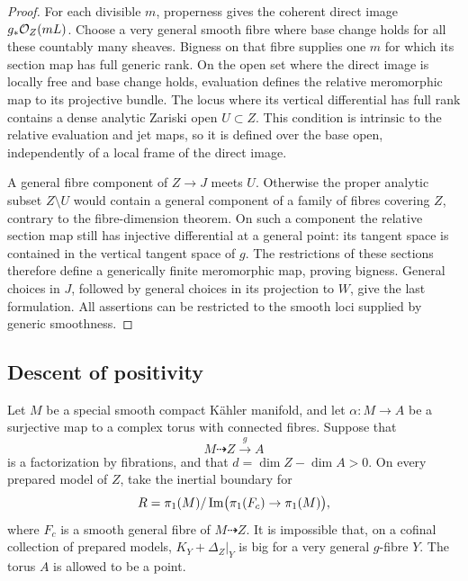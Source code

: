 \begin{proof}
For each divisible \(m\), properness gives the coherent direct image
\(g_*\mathcal O_Z(mL)\). Choose a very general smooth fibre where base
change holds for all these countably many sheaves. Bigness on that
fibre supplies one \(m\) for which its section map has full generic
rank. On the open set where the direct image is locally free and
base change holds, evaluation defines the relative meromorphic map
to its projective bundle. The locus where its vertical differential
has full rank contains a dense analytic Zariski open \(U\subset Z\).
This condition is intrinsic to the relative evaluation and jet maps,
so it is defined over the base open, independently of a local frame
of the direct image.

A general fibre component of \(Z\to J\) meets \(U\). Otherwise
the proper analytic subset \(Z\setminus U\) would contain a
general component of a family of fibres covering \(Z\), contrary
to the fibre-dimension theorem. On such a component the relative
section map still has injective differential at a general point:
its tangent space is contained in the vertical tangent space of
\(g\). The restrictions of these sections therefore define a
generically finite meromorphic map, proving bigness.
General choices in \(J\), followed by general choices in its
projection to \(W\), give the last formulation. All assertions can
be restricted to the smooth loci supplied by generic smoothness.
\end{proof}

\begin{samepage}
\subsection{Descent of positivity}

\begin{theorem}\label{thm:torus-descent}
Let \(M\) be a special smooth compact K\"ahler manifold, and let
\(\alpha:M\to A\) be a surjective map to a complex torus with
connected fibres. Suppose that
\[
 M\dashrightarrow Z\overset{g}{\longrightarrow}A
\]
is a factorization by fibrations, and that
\(d=\dim Z-\dim A>0\). On every prepared model of \(Z\),
take the inertial boundary for
\[
 R=\pi_1(M)/\operatorname{Im}\bigl(\pi_1(F_c)\to\pi_1(M)\bigr),
\]
where \(F_c\) is a smooth general fibre of \(M\dashrightarrow Z\).
It is impossible that, on a cofinal collection of prepared models,
\(K_Y+\Delta_Z|_Y\) is big for a very general \(g\)-fibre \(Y\).
The torus \(A\) is allowed to be a point.
\end{theorem}
\end{samepage}

